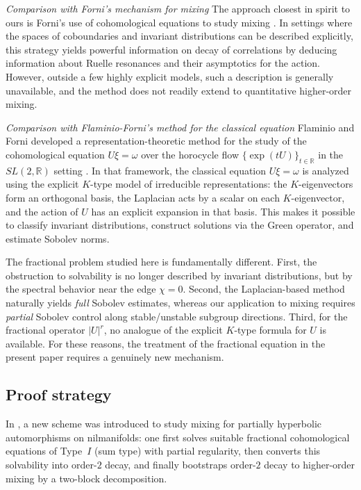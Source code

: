 \documentclass[11 pt]{amsart}
\newcommand{\RR}{\mathbb{R}}
\theoremstyle{definition}
\numberwithin{equation}{section}
\begin{document}
\emph{Comparison with Forni's mechanism for mixing}
The approach closest in spirit to ours is Forni’s use of cohomological equations to study mixing \cite{Forni1}. In settings where the spaces of coboundaries and invariant distributions can be described explicitly, this strategy yields powerful information on decay of correlations by deducing information about Ruelle resonances and their
asymptotics for the action.   However, outside a few highly explicit models, such a description is generally unavailable, and the method does not readily extend to quantitative higher-order mixing.




\emph{Comparison with Flaminio-Forni's method for the classical equation} Flaminio and Forni developed a representation-theoretic method for the study of the cohomological equation
 $U\xi=\omega$ over the horocycle flow $\{\exp(tU)\}_{t\in\RR}$ in the $SL(2,\RR)$ setting \cite{Forni}. In that framework, the classical equation \(U\xi=\omega\) is analyzed using the explicit \(K\)-type model of irreducible representations: the \(K\)-eigenvectors form an orthogonal basis, the Laplacian acts by a scalar on each \(K\)-eigenvector, and the action of \(U\) has an explicit expansion in that basis. This makes it possible to classify invariant distributions, construct solutions via the Green operator, and estimate Sobolev norms.

The fractional problem studied here is fundamentally different. First, the obstruction to solvability is no longer described by invariant distributions, but by the spectral behavior near the edge \(\chi=0\). Second, the Laplacian-based method naturally yields \emph{full} Sobolev estimates, whereas our application to mixing requires \emph{partial} Sobolev control along stable/unstable subgroup directions. Third, for the fractional operator \( |U|^r \), no analogue of the explicit \(K\)-type formula for \(U\) is available. For these reasons, the treatment of the fractional equation in the present paper requires a genuinely new mechanism.



\subsection{Proof strategy} In \cite{W2}, a new scheme was introduced to study mixing for partially hyperbolic automorphisms on nilmanifolds: one first solves suitable fractional cohomological equations of Type~$I$ (sum type) with partial regularity, then converts this solvability into order-$2$ decay, and finally bootstraps order-$2$ decay to higher-order mixing by a two-block decomposition.
\end{document}

